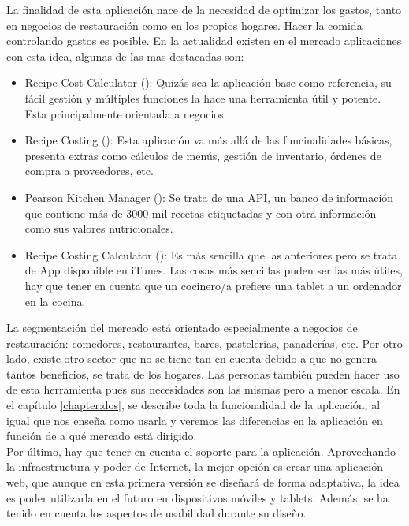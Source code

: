 \vspace*{0.1in}
La finalidad de esta aplicación nace de la necesidad de optimizar los gastos, tanto en negocios de restauración como en los propios hogares. Hacer la comida controlando gastos es posible. En la actualidad existen en el mercado aplicaciones con esta idea, algunas de las mas destacadas son:
\begin{itemize}
	\item Recipe Cost Calculator (\cite{URL:RecipeCostCalculator}): Quizás sea la aplicación base como referencia, su fácil gestión y múltiples funciones la hace una herramienta útil y potente. Esta principalmente orientada a negocios.
	\item Recipe Costing (\cite{URL:RecipeCosting}): Esta aplicación va más allá de las funcinalidades básicas, presenta extras como cálculos de menús, gestión de inventario, órdenes de compra a proveedores, etc.
	\item Pearson Kitchen Manager (\cite{URL:PearsonKitchenManagerg}): Se trata de una API, un banco de información que contiene más de 3000 mil recetas etiquetadas y con otra información como sus valores nutricionales.
	\item Recipe Costing Calculator (\cite{URL:RecipeCostingCalculator}): Es más sencilla que las anteriores pero se trata de App disponible en iTunes. Las cosas más sencillas puden ser las más útiles, hay que tener en cuenta que un cocinero/a prefiere una tablet a un ordenador en la cocina.
\end{itemize}
La segmentación del mercado está orientado especialmente a negocios de restauración: comedores, restaurantes, bares, pastelerías, panaderías, etc. Por otro lado, existe otro sector que no se tiene tan en cuenta debido a que no genera tantos beneficios, se trata de los hogares. Las personas también pueden hacer uso de esta herramienta pues sus necesidades son las mismas pero a menor escala. En el capítulo \ref{chapter:dos}, se describe toda la funcionalidad de la aplicación, al igual que nos enseña como usarla y veremos las diferencias en la aplicación en función de a qué mercado está dirigido.\\

Por último, hay que tener en cuenta el soporte para la aplicación. Aprovechando la infraestructura y poder de Internet, la mejor opción es crear una aplicación web, que aunque en esta primera versión se diseñará de forma adaptativa, la idea es poder utilizarla en el futuro en dispositivos móviles y tablets. Además, se ha tenido en cuenta los aspectos de usabilidad durante su diseño.

